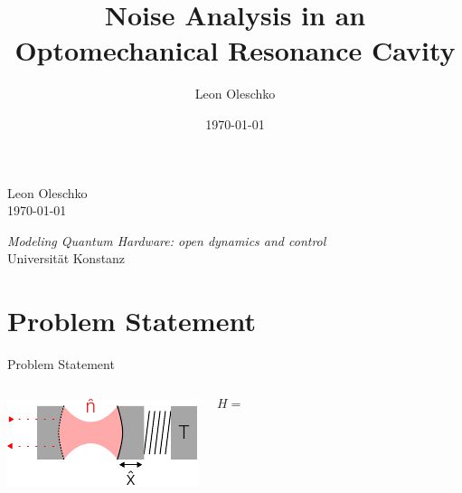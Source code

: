\documentclass{beamer}
\title{Noise Analysis in an Optomechanical Resonance Cavity}
\author{Leon Oleschko}
\institute{Universität Konstanz}
\date{\today}
\begin{document}
{
\begin{frame}
	\huge
	
	\vfill
	\normalsize
	Leon Oleschko\\
	\today
	
	\vfill
	\raggedleft
	\small
	\textit{Modeling Quantum Hardware: open dynamics and control}\\
	Universität Konstanz
\end{frame}
}

\section{Problem Statement}
\begin{frame}{Problem Statement}
	\begin{columns}
		\includegraphics[width=\textwidth]{figures/drawing.pdf}
		
		$$
		H = 
		$$
	\end{columns}

\end{frame}


{
	\begin{frame}[plain]{}\end{frame}
}
\end{document}
